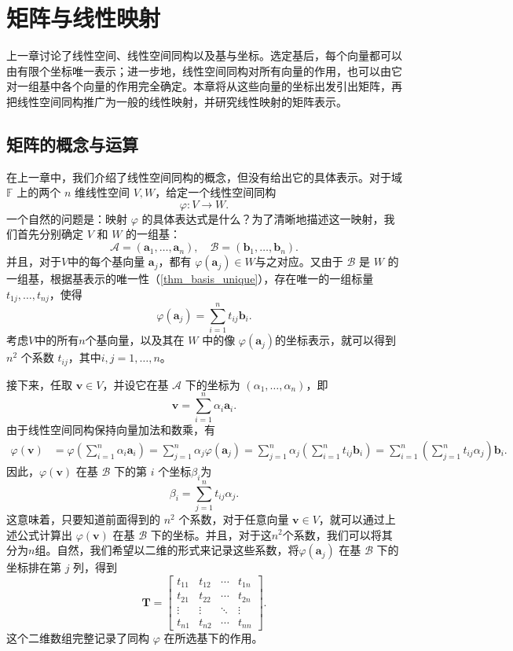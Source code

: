 \chapter{矩阵与线性映射}
\label{chap_matrix}

上一章讨论了线性空间、线性空间同构以及基与坐标。选定基后，每个向量都可以由有限个坐标唯一表示；进一步地，线性空间同构对所有向量的作用，也可以由它对一组基中各个向量的作用完全确定。本章将从这些向量的坐标出发引出矩阵，再把线性空间同构推广为一般的线性映射，并研究线性映射的矩阵表示。

\section{矩阵的概念与运算}
\label{sec_matrix_origin}

在上一章中，我们介绍了线性空间同构的概念，但没有给出它的具体表示。对于域 \(\mathbb F\) 上的两个 \(n\) 维线性空间 \(V,W\)，给定一个线性空间同构
\[
    \varphi:V\to W.
\]
一个自然的问题是：映射 \(\varphi\) 的具体表达式是什么？为了清晰地描述这一映射，我们首先分别确定 \(V\) 和 \(W\) 的一组基：
\[
    \mathcal A=(\bm a_1,\ldots,\bm a_n),
    \quad
    \mathcal B=(\bm b_1,\ldots,\bm b_n).
\]
并且，对于\( V \)中的每个基向量 \(\bm a_j\)，都有 \(\varphi(\bm a_j)\in W\)与之对应。又由于 \(\mathcal B\) 是 \(W\) 的一组基，根据基表示的唯一性（\cref{thm_basis_unique}），存在唯一的一组标量 \(t_{1j},\ldots,t_{nj}\)，使得
\[
    \varphi(\bm a_j) = \sum_{i=1}^{n} t_{ij}\bm b_i.
\]
考虑\( V \)中的所有\( n \)个基向量，以及其在 \(W\) 中的像 \(\varphi(\bm a_j)\)的坐标表示，就可以得到 \(n^2\) 个系数 \(t_{ij}\)，其中\( i,j=1,\ldots,n \)。

接下来，任取 \(\bm v\in V\)，并设它在基 \(\mathcal A\) 下的坐标为 \((\alpha_1, \ldots, \alpha_n)\)，即
\[
    \bm v = \sum_{i=1}^{n} \alpha_i\bm a_i.
\]
由于线性空间同构保持向量加法和数乘，有
\[
    \begin{aligned}
        \varphi(\bm v)
         & = \varphi\left(\sum_{i=1}^{n} \alpha_i\bm a_i\right)=\sum_{j=1}^{n} \alpha_j \varphi(\bm a_j) = \sum_{j=1}^{n} \alpha_j \left( \sum_{i=1}^{n} t_{ij}\bm b_i \right) = \sum_{i=1}^{n} \left( \sum_{j=1}^{n} t_{ij}\alpha_j \right) \bm b_i.
    \end{aligned}
\]
因此，\(\varphi(\bm v)\) 在基 \(\mathcal B\) 下的第 \(i\) 个坐标\( \beta_i \)为
\[
    \beta_i = \sum_{j=1}^{n}t_{ij}\alpha_j.
\]
这意味着，只要知道前面得到的 \(n^2\) 个系数，对于任意向量 \(\bm v\in V\)，就可以通过上述公式计算出 \(\varphi(\bm v)\) 在基 \(\mathcal B\) 下的坐标。并且，对于这\( n^2 \)个系数，我们可以将其分为\( n \)组。自然，我们希望以二维的形式来记录这些系数，将\(\varphi(\bm a_j)\) 在基 \( \mathcal{B} \) 下的坐标排在第 \(j\) 列，得到
\[
    \mathbf{T}=
    \begin{bmatrix}
        t_{11} & t_{12} & \cdots & t_{1n} \\
        t_{21} & t_{22} & \cdots & t_{2n} \\
        \vdots & \vdots & \ddots & \vdots \\
        t_{n1} & t_{n2} & \cdots & t_{nn}
    \end{bmatrix}.
\]
这个二维数组完整记录了同构 \(\varphi\) 在所选基下的作用。

